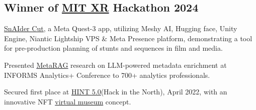 \subsection{Winner of {\textcolor{blue}{\underline{\href{https://devpost.com/software/snaider}{MIT XR}}} Hackathon 2024}} {\underline{\href{https://codeberg.org/reality-hack-2024/TABLE_62}{SnAIder Cut}}}, a Meta Quest-3 app, utilizing Meshy AI, Hugging face, Unity Engine, Niantic Lightship VPS \& Meta Presence platform, demonstrating a tool for pre-production planning of stunts and sequences in film and media.
            \item Presented \textcolor{blue}{\underline{ \href{https://github.com/PranavMishra17/Metadata-Enrichment-with-LLMs-for-RAGs-Internal-Knowledge-Retrieval}{MetaRAG}}} research on LLM-powered metadata enrichment at INFORMS Analytics+ Conference to 700+ analytics professionals.
            \item Secured first place at \textcolor{blue}{\underline{ \href{https://hint5.devfolio.co/overview}{HINT 5.0}}}(Hack in the North), April 2022, with an innovative NFT \textcolor{blue}{\underline{ \href{https://devfolio.co/projects/virtual-van-gogh-675c}{virtual museum}}} concept.


